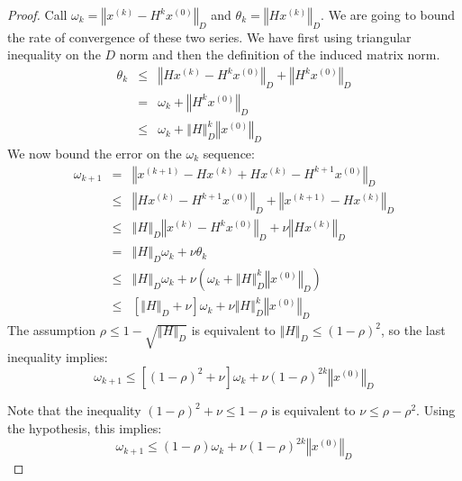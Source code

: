 \begin{proof}
Call $\omega_{k}=\left\Vert x^{\left(k\right)}-H^{k}x^{\left(0\right)}\right\Vert _{D}$
and $\theta_{k}=\left\Vert Hx^{\left(k\right)}\right\Vert _{D}$.
We are going to bound the rate of convergence of these two series.
We have first using triangular inequality on the $D$ norm and then
the definition of the induced matrix norm. 
\begin{eqnarray*}
\theta_{k} & \leq & \left\Vert Hx^{\left(k\right)}-H^{k}x^{\left(0\right)}\right\Vert _{D}+\left\Vert H^{k}x^{\left(0\right)}\right\Vert _{D}\\
 & = & \omega_{k}+\left\Vert H^{k}x^{\left(0\right)}\right\Vert _{D}\\
 & \leq & \omega_{k}+\left\Vert H\right\Vert _{D}^{k}\left\Vert x^{\left(0\right)}\right\Vert _{D}
\end{eqnarray*}
We now bound the error on the $\omega_{k}$ sequence: 
\begin{eqnarray*}
\omega_{k+1} & = & \left\Vert x^{\left(k+1\right)}-Hx^{\left(k\right)}+Hx^{\left(k\right)}-H^{k+1}x^{\left(0\right)}\right\Vert _{D}\\
 & \leq & \left\Vert Hx^{\left(k\right)}-H^{k+1}x^{\left(0\right)}\right\Vert _{D}+\left\Vert x^{\left(k+1\right)}-Hx^{\left(k\right)}\right\Vert _{D}\\
 & \leq & \left\Vert H\right\Vert _{D}\left\Vert x^{\left(k\right)}-H^{k}x^{\left(0\right)}\right\Vert _{D}+\nu\left\Vert Hx^{\left(k\right)}\right\Vert _{D}\\
 & = & \left\Vert H\right\Vert _{D}\omega_{k}+\nu\theta_{k}\\
 & \leq & \left\Vert H\right\Vert _{D}\omega_{k}+\nu\left(\omega_{k}+\left\Vert H\right\Vert _{D}^{k}\left\Vert x^{\left(0\right)}\right\Vert _{D}\right)\\
 & \leq & \left[\left\Vert H\right\Vert _{D}+\nu\right]\omega_{k}+\nu\left\Vert H\right\Vert _{D}^{k}\left\Vert x^{\left(0\right)}\right\Vert _{D}
\end{eqnarray*}
The assumption $\rho\leq1-\sqrt{\left\Vert H\right\Vert _{D}}$ is
equivalent to $\left\Vert H\right\Vert _{D}\leq\left(1-\rho\right)^{2}$,
so the last inequality implies: 
\[
\omega_{k+1}\leq\left[\left(1-\rho\right)^{2}+\nu\right]\omega_{k}+\nu\left(1-\rho\right)^{2k}\left\Vert x^{\left(0\right)}\right\Vert _{D}
\]


Note that the inequality $\left(1-\rho\right)^{2}+\nu\leq1-\rho$
is equivalent to $\nu\leq\rho-\rho^{2}$. Using the hypothesis, this
implies: 
\begin{equation}
\omega_{k+1}\leq\left(1-\rho\right)\omega_{k}+\nu\left(1-\rho\right)^{2k}\left\Vert x^{\left(0\right)}\right\Vert _{D}\label{eq:anon1}
\end{equation}



\end{proof}
